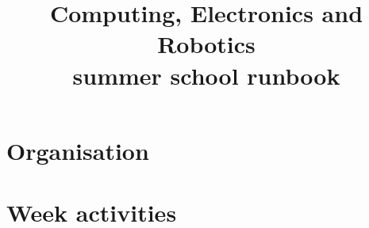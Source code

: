 \documentclass[a4paper]{report}
\title{Computing, Electronics and Robotics \\ summer school runbook}
\begin{document}
\maketitle

\tableofcontents
\clearpage
\listoffigures
\clearpage
\listoftables
\clearpage
\listoftask
\clearpage


\chapter{Organisation}






\chapter{Week activities}



\end{document}
